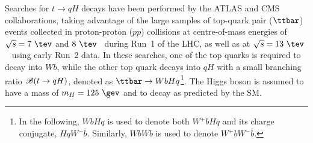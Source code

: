 \documentclass[PAPER, coverpage, atlasdraft=true, texlive=2016, UKenglish]{\ATLASLATEXPATH atlasdoc}
\begin{document}
Searches for $t \to qH$ decays have been performed by the ATLAS and CMS collaborations, taking advantage of the large samples
of top-quark pair ($\ttbar$) events collected in proton-proton ($pp$) collisions at centre-of-mass energies of $\sqrt{s}=7~\tev$ and $8~\tev$~\cite{Aad:2014dya,Aad:2015pja,Khachatryan:2016atv} during Run~1 of the LHC, as well as at $\sqrt{s}=13~\tev$~\cite{fcnc36} using early Run~2 data.
In these searches, one of the top quarks is required to decay into $Wb$, while the other top quark decays into $qH$ with a small branching ratio 
 $\mathscr{B}(t\to qH)$, denoted as $\ttbar \to WbHq$\footnote{In the following, $WbHq$ is used to denote both $W^+b H\bar{q}$ and its charge conjugate, $HqW^- \bar{b}$. Similarly, 
$WbWb$ is used to denote $W^+b W^- \bar{b}$.}.  The Higgs boson is assumed to have a mass of $m_H=125~\gev$ and to decay as predicted by
the SM.
\end{document}
